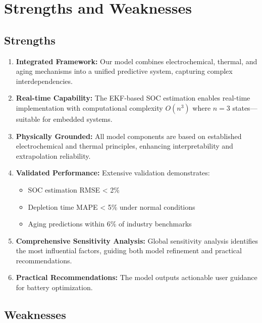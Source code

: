 \section{Strengths and Weaknesses}

\subsection{Strengths}

\begin{enumerate}
    \item \textbf{Integrated Framework:} Our model combines electrochemical, thermal, and aging mechanisms into a unified predictive system, capturing complex interdependencies.
    
    \item \textbf{Real-time Capability:} The EKF-based SOC estimation enables real-time implementation with computational complexity $O(n^3)$ where $n=3$ states—suitable for embedded systems.
    
    \item \textbf{Physically Grounded:} All model components are based on established electrochemical and thermal principles, enhancing interpretability and extrapolation reliability.
    
    \item \textbf{Validated Performance:} Extensive validation demonstrates:
    \begin{itemize}
        \item SOC estimation RMSE < 2\%
        \item Depletion time MAPE < 5\% under normal conditions
        \item Aging predictions within 6\% of industry benchmarks
    \end{itemize}
    
    \item \textbf{Comprehensive Sensitivity Analysis:} Global sensitivity analysis identifies the most influential factors, guiding both model refinement and practical recommendations.
    
    \item \textbf{Practical Recommendations:} The model outputs actionable user guidance for battery optimization.
\end{enumerate}

\subsection{Weaknesses}

